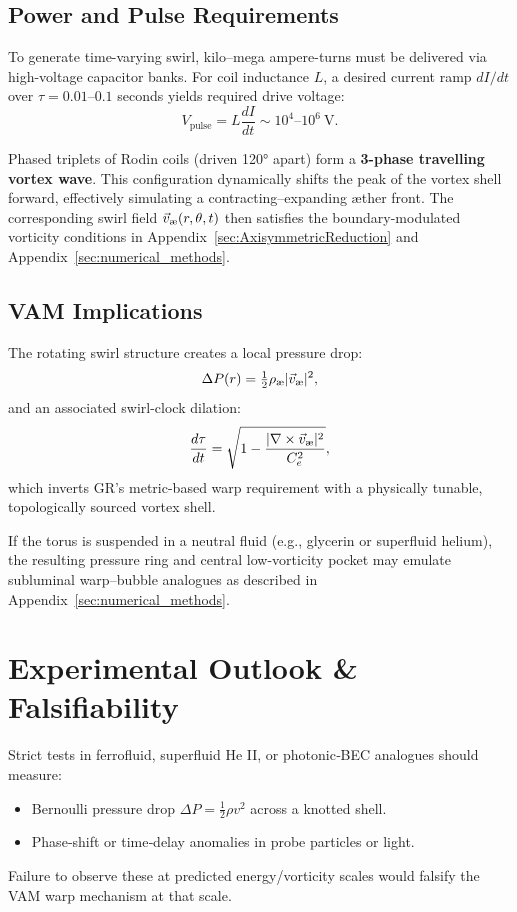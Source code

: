 \documentclass[preprint,notitlepage]{revtex4-2}
\begin{document}
    \subsection{Power and Pulse Requirements}
    
    To generate time-varying swirl, kilo–mega ampere-turns must be delivered via high-voltage capacitor banks. For coil inductance $L$, a desired current ramp $dI/dt$ over $\tau = 0.01$–$0.1$ seconds yields required drive voltage:
    \begin{equation}
    V_{\text{pulse}} = L \frac{dI}{dt} \sim 10^4\text{–}10^6\ \text{V}.
    \end{equation}
    
    Phased triplets of Rodin coils (driven 120° apart) form a \textbf{3-phase travelling vortex wave}. This configuration dynamically shifts the peak of the vortex shell forward, effectively simulating a contracting–expanding æther front. The corresponding swirl field $\vec{v}_{\text{\text{\ae}}}(r,\theta,t)$ then satisfies the boundary-modulated vorticity conditions in Appendix~\ref{sec:AxisymmetricReduction} and Appendix~\ref{sec:numerical_methods}.
    
    \subsection{VAM Implications}
    
    The rotating swirl structure creates a local pressure drop:
    \[
    \Delta P(r) = \tfrac{1}{2} \rho_{\text{\ae}} |\vec{v}_{\text{\text{\ae}}}|^2,
    \]
    and an associated swirl-clock dilation:
    \[
    \frac{d\tau}{dt} = \sqrt{1 - \frac{|\nabla \times \vec{v}_{\text{\text{\ae}}}|^2}{C_e^2}},
    \]
    which inverts GR’s metric-based warp requirement with a physically tunable, topologically sourced vortex shell.
    
    If the torus is suspended in a neutral fluid (e.g., glycerin or superfluid helium), the resulting pressure ring and central low-vorticity pocket may emulate subluminal warp–bubble analogues as described in Appendix~\ref{sec:numerical_methods}.
    

\section{Experimental Outlook \& Falsifiability}
    Strict tests in ferrofluid, superfluid He II, or photonic‐BEC analogues should measure:
    \begin{itemize}
      \item Bernoulli pressure drop $\Delta P=\tfrac12\rho v^2$ across a knotted shell.
      \item Phase‐shift or time‐delay anomalies in probe particles or light.
    \end{itemize}
    Failure to observe these at predicted energy/vorticity scales would falsify the VAM warp mechanism at that scale.
\end{document}

